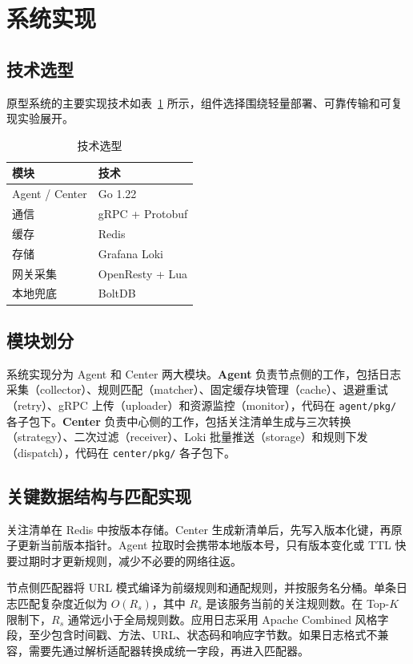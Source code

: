 \section{系统实现}

\subsection{技术选型}
原型系统的主要实现技术如表~\ref{tab:tech} 所示，组件选择围绕轻量部署、可靠传输和可复现实验展开。
\begin{table}[H]
  \centering
  \small
  \caption{技术选型}\label{tab:tech}
  \begin{tabular*}{\textwidth}{@{\extracolsep{\fill}}ll}
    \toprule
    模块 & 技术 \\
    \midrule
    Agent / Center & Go 1.22 \\
    通信 & gRPC + Protobuf \\
    缓存 & Redis \\
    存储 & Grafana Loki \\
    网关采集 & OpenResty + Lua \\
    本地兜底 & BoltDB \\
    \bottomrule
  \end{tabular*}
\end{table}
\subsection{模块划分}
系统实现分为 Agent 和 Center 两大模块。\textbf{Agent} 负责节点侧的工作，包括日志采集（collector）、规则匹配（matcher）、固定缓存块管理（cache）、退避重试（retry）、gRPC 上传（uploader）和资源监控（monitor），代码在 \texttt{agent/pkg/} 各子包下。\textbf{Center} 负责中心侧的工作，包括关注清单生成与三次转换（strategy）、二次过滤（receiver）、Loki 批量推送（storage）和规则下发（dispatch），代码在 \texttt{center/pkg/} 各子包下。

\subsection{关键数据结构与匹配实现}
关注清单在 Redis 中按版本存储。Center 生成新清单后，先写入版本化键，再原子更新当前版本指针。Agent 拉取时会携带本地版本号，只有版本变化或 TTL 快要过期时才更新规则，减少不必要的网络往返。

节点侧匹配器将 URL 模式编译为前缀规则和通配规则，并按服务名分桶。单条日志匹配复杂度近似为 $O(R_s)$，其中 $R_s$ 是该服务当前的关注规则数。在 Top-$K$ 限制下，$R_s$ 通常远小于全局规则数。应用日志采用 Apache Combined 风格字段，至少包含时间戳、方法、URL、状态码和响应字节数。如果日志格式不兼容，需要先通过解析适配器转换成统一字段，再进入匹配器。

